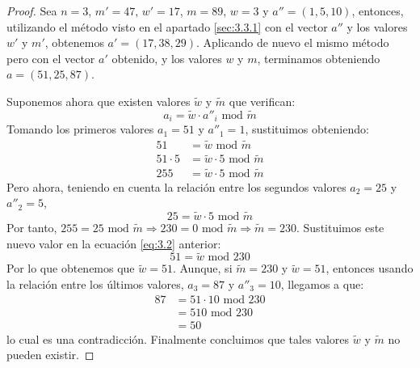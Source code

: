     \begin{proof}
        Sea $n = 3$, $m' = 47$, $w' = 17$, $m = 89$, $w = 3$ y $a'' = (1, 5, 10)$, entonces, utilizando el método visto en el apartado \ref{sec:3.3.1} con el vector $a''$ y los valores $w'$ y $m'$, obtenemos $a' = (17, 38, 29)$. Aplicando de nuevo el mismo método pero con el vector $a'$ obtenido, y los valores $w$ y $m$, terminamos obteniendo $a = (51, 25, 87)$.

        Suponemos ahora que existen valores $\widetilde{w}$ y $\widetilde{m}$ que verifican:
        \begin{equation}
            a_{i} = \widetilde{w} \cdot a''_{i} \text{ mod } \widetilde{m}
        \end{equation}
        Tomando los primeros valores $a_{1} = 51$ y $a''_{1} = 1$, sustituimos obteniendo:
        \begin{align} \label{eq:3.2}
            51 &= \widetilde{w} \text{ mod } \widetilde{m} \\
            51 \cdot 5 &= \widetilde{w} \cdot 5 \text{ mod } \widetilde{m} \\
            255 &= \widetilde{w} \cdot 5 \text{ mod } \widetilde{m}
        \end{align}
        Pero ahora, teniendo en cuenta la relación entre los segundos valores $a_{2} = 25$ y $a''_{2} = 5$,
        \begin{equation}
            25 = \widetilde{w} \cdot 5 \text{ mod } \widetilde{m}
        \end{equation}
        Por tanto, $255 = 25 \text{ mod } \widetilde{m} \Rightarrow 230 = 0 \text{ mod } \widetilde{m} \Rightarrow \widetilde{m} = 230$. Sustituimos este nuevo valor en la ecuación \eqref{eq:3.2} anterior:
        \begin{equation}
            51 = \widetilde{w} \text{ mod } 230
        \end{equation}
        Por lo que obtenemos que $\widetilde{w} = 51$. Aunque, si $\widetilde{m} = 230$ y $\widetilde{w} = 51$, entonces usando la relación entre los últimos valores, $a_{3} = 87$ y $a''_{3} = 10$, llegamos a que:
        \begin{align}
            87 &= 51 \cdot 10 \text{ mod } 230 \\
            &= 510 \text{ mod } 230 \\
            &= 50
        \end{align}
        lo cual es una contradicción. Finalmente concluimos que tales valores $\widetilde{w}$ y $\widetilde{m}$ no pueden existir.
    \end{proof}

